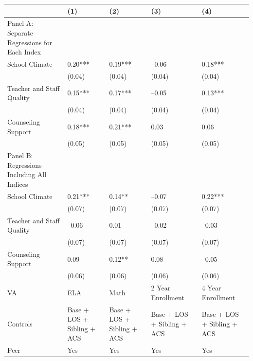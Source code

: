 \begin{table}[tbp] \centering
{}

{\footnotesize
\begin{tabularx}{\linewidth}{lCCCC}

\toprule
&{(1)}&{(2)}&{(3)}&{(4)} \tabularnewline
\midrule \addlinespace[\belowrulesep]
Panel A: Separate Regressions for Each Index&&&& \tabularnewline
\midrule School Climate&0.20***&0.19***&--0.06&0.18*** \tabularnewline
&(0.04)&(0.04)&(0.04)&(0.04) \tabularnewline
Teacher and Staff Quality&0.15***&0.17***&--0.05&0.13*** \tabularnewline
&(0.04)&(0.04)&(0.04)&(0.04) \tabularnewline
Counseling Support&0.18***&0.21***&0.03&0.06 \tabularnewline
&(0.05)&(0.05)&(0.05)&(0.05) \tabularnewline
\midrule \midrule Panel B: Regressions Including All Indices&&&& \tabularnewline
\midrule School Climate&0.21***&0.14**&--0.07&0.22*** \tabularnewline
&(0.07)&(0.07)&(0.07)&(0.07) \tabularnewline
Teacher and Staff Quality&--0.06&0.01&--0.02&--0.03 \tabularnewline
&(0.07)&(0.07)&(0.07)&(0.07) \tabularnewline
Counseling Support&0.09&0.12**&0.08&--0.05 \tabularnewline
&(0.06)&(0.06)&(0.06)&(0.06) \tabularnewline
\midrule VA&ELA&Math&2 Year Enrollment&4 Year Enrollment \tabularnewline
Controls&Base + LOS + Sibling + ACS&Base + LOS + Sibling + ACS&Base + LOS + Sibling + ACS&Base + LOS + Sibling + ACS \tabularnewline
Peer&Yes&Yes&Yes&Yes \tabularnewline
\bottomrule 

\end{tabularx}
}
\end{table}
